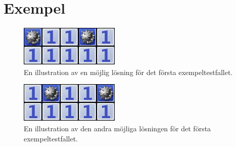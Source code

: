 \section*{Exempel}

\begin{figure}[h!]
\begin{center}
\includegraphics[scale=1]{miniroj1}
\end{center}
\caption{En illustration av en möjlig lösning för det första exempeltestfallet.}
\label{fig1}
\end{figure}

\begin{figure}[h!]
\begin{center}
\includegraphics[scale=1]{miniroj2}
\end{center}
\caption{En illustration av den andra möjliga lösningen för det första exempeltestfallet.}
\label{fig1}
\end{figure}

